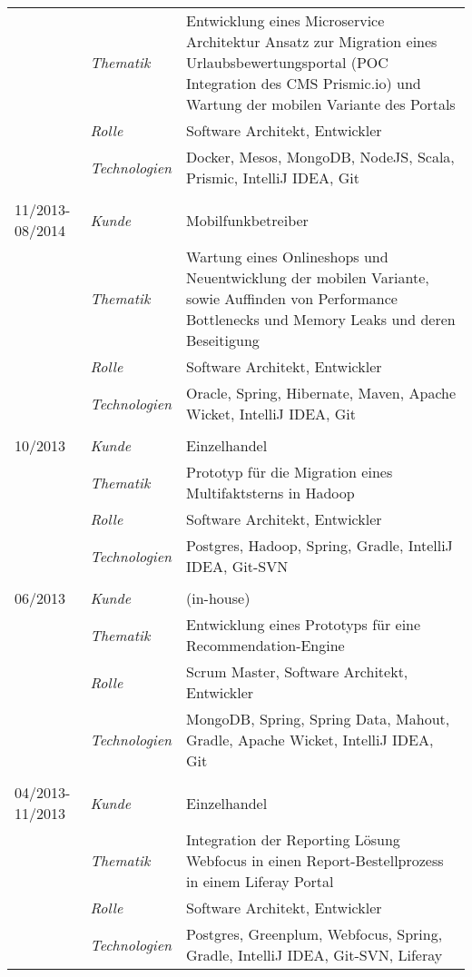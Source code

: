 \begin{longtable}{@{}>{}p{4cm}>{\itshape}p{2cm}>{}p{9cm}}
\nopagebreak		& Thematik	    & Entwicklung eines Microservice Architektur Ansatz zur Migration eines Urlaubsbewertungsportal (POC Integration des CMS Prismic.io) und Wartung der mobilen Variante des Portals\\
\nopagebreak		& Rolle 	    & Software Architekt, Entwickler\\
\nopagebreak		& Technologien	& Docker, Mesos, MongoDB, NodeJS, Scala, Prismic, IntelliJ IDEA, Git\\
\\
11/2013-08/2014     & Kunde 	    & Mobilfunkbetreiber\\
\nopagebreak		& Thematik	    & Wartung eines Onlineshops und Neuentwicklung der mobilen Variante, sowie Auffinden von Performance Bottlenecks und Memory Leaks und deren Beseitigung\\
\nopagebreak		& Rolle 	    & Software Architekt, Entwickler\\
\nopagebreak		& Technologien	& Oracle, Spring, Hibernate, Maven, Apache Wicket, IntelliJ IDEA, Git\\
\\
10/2013             & Kunde 	    & Einzelhandel\\
\nopagebreak		& Thematik	    & Prototyp für die Migration eines Multifaktsterns in Hadoop\\
\nopagebreak		& Rolle 	    & Software Architekt, Entwickler\\
\nopagebreak		& Technologien	& Postgres, Hadoop, Spring, Gradle, IntelliJ IDEA, Git-SVN\\
\\
06/2013             & Kunde 	    & (in-house)\\
\nopagebreak		& Thematik	    & Entwicklung eines Prototyps für eine Recommendation-Engine\\
\nopagebreak		& Rolle 	    & Scrum Master, Software Architekt, Entwickler\\
\nopagebreak		& Technologien	& MongoDB, Spring, Spring Data, Mahout, Gradle, Apache Wicket, IntelliJ IDEA, Git\\
\\
04/2013-11/2013     & Kunde 	    & Einzelhandel\\
\nopagebreak		& Thematik	    & Integration der Reporting Lösung Webfocus in einen Report-Bestellprozess in einem Liferay Portal\\
\nopagebreak		& Rolle 	    & Software Architekt, Entwickler\\
\nopagebreak		& Technologien	& Postgres, Greenplum, Webfocus, Spring, Gradle, IntelliJ IDEA, Git-SVN, Liferay\\

\end{longtable}

